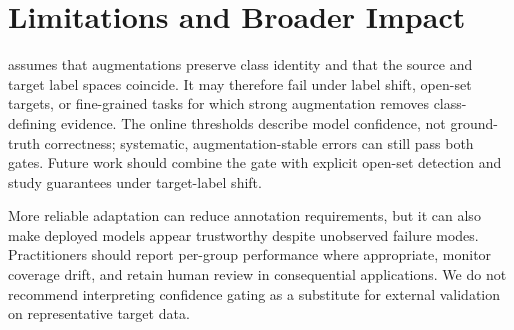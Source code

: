 \section{Limitations and Broader Impact}

\method{} assumes that augmentations preserve class identity and that the source
and target label spaces coincide. It may therefore fail under label shift,
open-set targets, or fine-grained tasks for which strong augmentation removes
class-defining evidence. The online thresholds describe model confidence, not
ground-truth correctness; systematic, augmentation-stable errors can still pass
both gates. Future work should combine the gate with explicit open-set detection
and study guarantees under target-label shift.

More reliable adaptation can reduce annotation requirements, but it can also
make deployed models appear trustworthy despite unobserved failure modes.
Practitioners should report per-group performance where appropriate, monitor
coverage drift, and retain human review in consequential applications. We do
not recommend interpreting confidence gating as a substitute for external
validation on representative target data.

